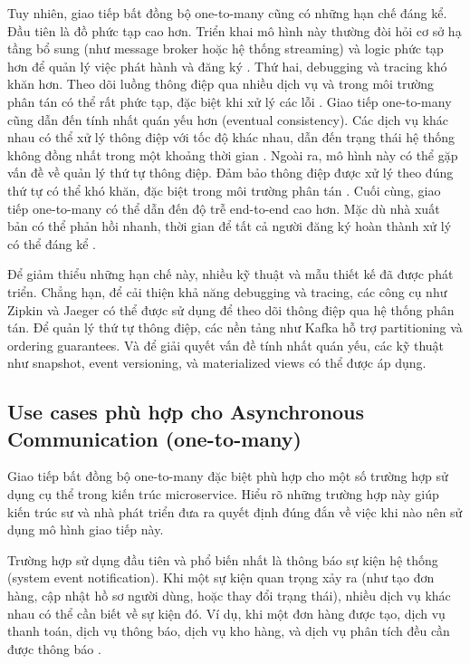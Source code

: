 Tuy nhiên, giao tiếp bất đồng bộ one-to-many cũng có những hạn chế đáng kể. Đầu tiên là đồ phức tạp cao hơn. Triển khai mô hình này thường đòi hỏi cơ sở hạ tầng bổ sung (như message broker hoặc hệ thống streaming) và logic phức tạp hơn để quản lý việc phát hành và đăng ký \cite{newman2015}. Thứ hai, debugging và tracing khó khăn hơn. Theo dõi luồng thông điệp qua nhiều dịch vụ và trong môi trường phân tán có thể rất phức tạp, đặc biệt khi xử lý các lỗi \cite{wolff2016}. Giao tiếp one-to-many cũng dẫn đến tính nhất quán yếu hơn (eventual consistency). Các dịch vụ khác nhau có thể xử lý thông điệp với tốc độ khác nhau, dẫn đến trạng thái hệ thống không đồng nhất trong một khoảng thời gian \cite{richardson2019}. Ngoài ra, mô hình này có thể gặp vấn đề về quản lý thứ tự thông điệp. Đảm bảo thông điệp được xử lý theo đúng thứ tự có thể khó khăn, đặc biệt trong môi trường phân tán \cite{aksakalli2021}. Cuối cùng, giao tiếp one-to-many có thể dẫn đến độ trễ end-to-end cao hơn. Mặc dù nhà xuất bản có thể phản hồi nhanh, thời gian để tất cả người đăng ký hoàn thành xử lý có thể đáng kể \cite{jun2018}.

Để giảm thiểu những hạn chế này, nhiều kỹ thuật và mẫu thiết kế đã được phát triển. Chẳng hạn, để cải thiện khả năng debugging và tracing, các công cụ như Zipkin và Jaeger có thể được sử dụng để theo dõi thông điệp qua hệ thống phân tán. Để quản lý thứ tự thông điệp, các nền tảng như Kafka hỗ trợ partitioning và ordering guarantees. Và để giải quyết vấn đề tính nhất quán yếu, các kỹ thuật như snapshot, event versioning, và materialized views có thể được áp dụng.

\subsection{Use cases phù hợp cho Asynchronous Communication (one-to-many)}
Giao tiếp bất đồng bộ one-to-many đặc biệt phù hợp cho một số trường hợp sử dụng cụ thể trong kiến trúc microservice. Hiểu rõ những trường hợp này giúp kiến trúc sư và nhà phát triển đưa ra quyết định đúng đắn về việc khi nào nên sử dụng mô hình giao tiếp này.

Trường hợp sử dụng đầu tiên và phổ biến nhất là thông báo sự kiện hệ thống (system event notification). Khi một sự kiện quan trọng xảy ra (như tạo đơn hàng, cập nhật hồ sơ người dùng, hoặc thay đổi trạng thái), nhiều dịch vụ khác nhau có thể cần biết về sự kiện đó. Ví dụ, khi một đơn hàng được tạo, dịch vụ thanh toán, dịch vụ thông báo, dịch vụ kho hàng, và dịch vụ phân tích đều cần được thông báo \cite{newman2015}.

